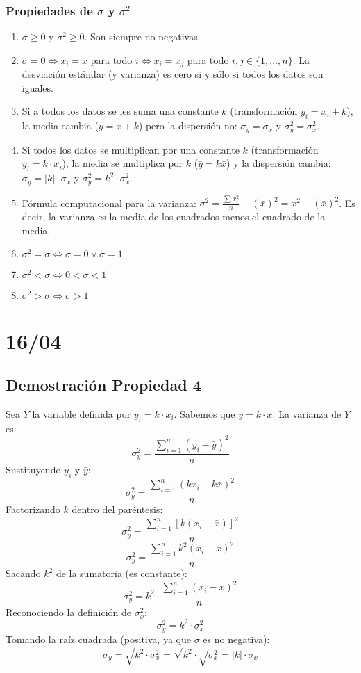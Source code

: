 \documentclass[12pt, letterpaper]{article}
\begin{document}
\subsubsection{Propiedades de $\sigma$ y $\sigma^2$}
\begin{center}
    \begin{enumerate}
        \item $\sigma \ge 0$ y $\sigma^2 \ge 0$. Son siempre no negativas. %
        \item $\sigma = 0 \iff x_i = \bar{x}$ para todo $i \iff x_i = x_j$ para todo $i, j \in \{1, \dots, n\}$. La desviación estándar (y varianza) es cero si y sólo si todos los datos son iguales. %
        \item Si a todos los datos se les suma una constante $k$ (transformación $y_i = x_i + k$), la media cambia ($\bar{y} = \bar{x} + k$) pero la dispersión no: $\sigma_y = \sigma_x$ y $\sigma_y^2 = \sigma_x^2$. %
        \item Si todos los datos se multiplican por una constante $k$ (transformación $y_i = k \cdot x_i$), la media se multiplica por $k$ ($\bar{y} = k\bar{x}$) y la dispersión cambia: $\sigma_y = |k| \cdot \sigma_x$ y $\sigma_y^2 = k^2 \cdot \sigma_x^2$. %
        \item Fórmula computacional para la varianza: $\sigma^2 = \frac{\sum x_i^2}{n} - (\bar{x})^2 = \overline{x^2} - (\bar{x})^2$. Es decir, la varianza es la media de los cuadrados menos el cuadrado de la media. %
        \item $\sigma^2=\sigma \iff \sigma=0 \vee \sigma=1$
        \item $\sigma^2 < \sigma \iff 0<\sigma<1 $
        \item $\sigma^2 > \sigma \iff \sigma>1$
    \end{enumerate}
\end{center}
\newpage

\section{16/04}
\subsection{Demostración Propiedad 4}
Sea $Y$ la variable definida por $y_i = k \cdot x_i$. Sabemos que $\bar{y} = k \cdot \bar{x}$.
La varianza de $Y$ es:
\[\sigma_y^2=\frac{\sum_{i=1}^{n} (y_i - \bar{y})^2}{n} \]
Sustituyendo $y_i$ y $\bar{y}$:
\[\sigma_y^2=\frac{\sum_{i=1}^{n} (kx_i - k\bar{x})^2}{n}\]
Factorizando $k$ dentro del paréntesis:
\[\sigma_y^2=\frac{\sum_{i=1}^{n} [k(x_i - \bar{x})]^2}{n}\]
\[\sigma_y^2=\frac{\sum_{i=1}^{n} k^2(x_i - \bar{x})^2}{n}\]
Sacando $k^2$ de la sumatoria (es constante):
\[\sigma_y^2=k^2 \cdot \frac{\sum_{i=1}^{n} (x_i - \bar{x})^2}{n}\]
Reconociendo la definición de $\sigma_x^2$:
\[\sigma_y^2=k^2 \cdot \sigma_x^2\]
Tomando la raíz cuadrada (positiva, ya que $\sigma$ es no negativa):
\[\sigma_y = \sqrt{k^2 \cdot \sigma_x^2} = \sqrt{k^2} \cdot \sqrt{\sigma_x^2} = |k| \cdot \sigma_x\]
\end{document}
